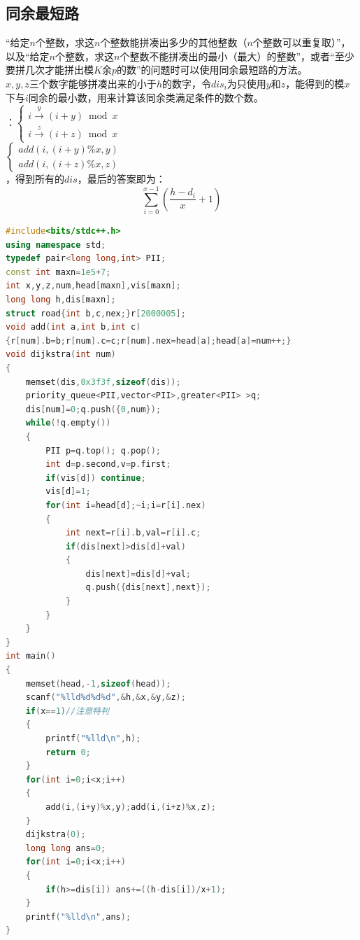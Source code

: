 \documentclass[a4paper]{book}
\begin{document}
\subsection{同余最短路}
“给定$n$个整数，求这$n$个整数能拼凑出多少的其他整数（$n$个整数可以重复取）”，以及“给定$n$个整数，求这$n$个整数不能拼凑出的最小（最大）的整数”，或者“至少要拼几次才能拼出模$K$余$p$的数”的问题时可以使用同余最短路的方法。\\
$x,y,z$三个数字能够拼凑出来的小于$h$的数字，令$dis_i$为只使用$y$和$z$，能得到的模$x$下与$i$同余的最小数，用来计算该同余类满足条件的数个数。\\
：$\begin{cases}i\xrightarrow{y}(i+y)\bmod x \\ i\xrightarrow{z}(i+z)\bmod x\end{cases}$\\
$\begin{cases}add(i,(i+y) \% x, y)\\add(i, (i+z) \% x, z)\end{cases}$\\
，得到所有的$dis$，最后的答案即为：\\
$$
\sum_{i=0}^{x-1}\left(\frac{h-d_i}{x}+1\right)
$$
\begin{lstlisting}[language=C++]
#include<bits/stdc++.h>
using namespace std;
typedef pair<long long,int> PII;
const int maxn=1e5+7;
int x,y,z,num,head[maxn],vis[maxn];
long long h,dis[maxn];
struct road{int b,c,nex;}r[2000005];
void add(int a,int b,int c)
{r[num].b=b;r[num].c=c;r[num].nex=head[a];head[a]=num++;}
void dijkstra(int num)
{
    memset(dis,0x3f3f,sizeof(dis));
    priority_queue<PII,vector<PII>,greater<PII> >q;
    dis[num]=0;q.push({0,num});
    while(!q.empty())
    {
        PII p=q.top(); q.pop();
        int d=p.second,v=p.first;
        if(vis[d]) continue;
        vis[d]=1;
        for(int i=head[d];~i;i=r[i].nex)
        {
            int next=r[i].b,val=r[i].c;
            if(dis[next]>dis[d]+val)
            {
                dis[next]=dis[d]+val;
                q.push({dis[next],next});
            }
        }
    }
}
int main()
{
    memset(head,-1,sizeof(head));
    scanf("%lld%d%d%d",&h,&x,&y,&z);
    if(x==1)//注意特判
    {
        printf("%lld\n",h);
        return 0;
    }
    for(int i=0;i<x;i++)
    {
        add(i,(i+y)%x,y);add(i,(i+z)%x,z);
    }
    dijkstra(0);
    long long ans=0;
    for(int i=0;i<x;i++) 
    {
        if(h>=dis[i]) ans+=((h-dis[i])/x+1);
    }
    printf("%lld\n",ans);
}
\end{lstlisting}
\end{document}
